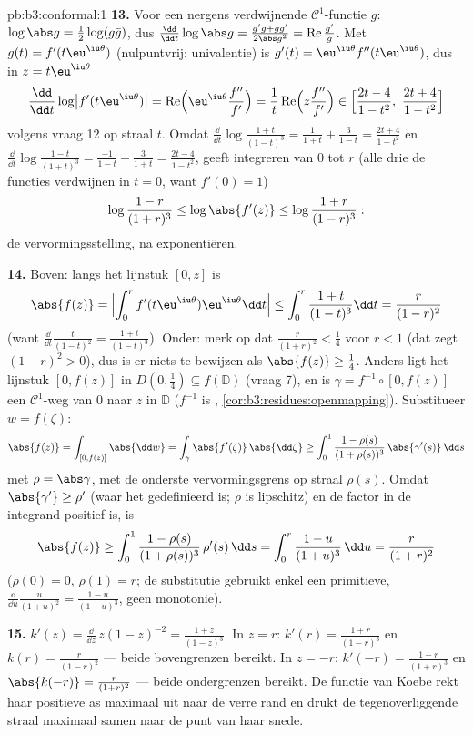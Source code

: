 \begin{solution}{pb:b3:conformal:1}
\textbf{13.} Voor een nergens verdwijnende $\mathcal C^1$-functie
$g$: $\log\abs g = \frac12\log(g\bar g)$, dus $\frac{\dd}{\dd
t}\log\abs g = \frac{g'\bar g + g\bar g'}{2\abs g^2} =
\operatorname{Re}\frac{g'}g$. Met $g(t) = f'(t\eu^{\iu\theta})$
(nulpuntvrij: univalentie) is $g'(t) =
\eu^{\iu\theta}f''(t\eu^{\iu\theta})$, dus in $z =
t\eu^{\iu\theta}$
\[
\frac{\dd}{\dd t}\log\bigl|f'(t\eu^{\iu\theta})\bigr|
= \operatorname{Re}\Bigl(\eu^{\iu\theta}
\frac{f''}{f'}\Bigr)
= \frac1t\operatorname{Re}\Bigl(z\frac{f''}{f'}\Bigr)
\in \Bigl[\frac{2t - 4}{1 - t^2},\
\frac{2t + 4}{1 - t^2}\Bigr]
\]
volgens vraag 12 op straal $t$. Omdat $\frac{\dd}{\dd
t}\log\frac{1+t}{(1-t)^3} = \frac1{1+t} + \frac3{1-t} =
\frac{2t+4}{1-t^2}$ en $\frac{\dd}{\dd
t}\log\frac{1-t}{(1+t)^3} = \frac{-1}{1-t} - \frac3{1+t} =
\frac{2t-4}{1-t^2}$, geeft integreren van $0$ tot $r$ (alle drie
de functies verdwijnen in $t = 0$, want $f'(0) = 1$)
\[
\log\frac{1-r}{(1+r)^3} \leq \log\abs{f'(z)} \leq
\log\frac{1+r}{(1-r)^3} :
\]
de vervormingsstelling, na exponentiëren.

\textbf{14.} Boven: langs het lijnstuk $[0, z]$ is
\[
\abs{f(z)} = \Bigl|\int_0^rf'(t\eu^{\iu\theta})
\eu^{\iu\theta}\dd t\Bigr|
\leq \int_0^r\frac{1+t}{(1-t)^3}\dd t
= \frac{r}{(1-r)^2}
\]
(want $\frac{\dd}{\dd t}\frac t{(1-t)^2} =
\frac{1+t}{(1-t)^3}$). Onder: merk op dat $\frac r{(1+r)^2} <
\frac14$ voor $r < 1$ (dat zegt $(1-r)^2 > 0$), dus is er niets
te bewijzen als $\abs{f(z)} \geq \frac14$. Anders ligt het
lijnstuk $[0, f(z)]$ in $D(0, \frac14) \subseteq f(\mathbb D)$
(vraag 7), en is $\gamma = f^{-1}\circ[0, f(z)]$ een $\mathcal
C^1$-weg van $0$ naar $z$ in $\mathbb D$ ($f^{-1}$ is ,
\cref{cor:b3:residues:openmapping}). Substitueer $w = f(\zeta)$:
\[
\abs{f(z)} = \int_{[0,f(z)]}\abs{\dd w}
= \int_\gamma\abs{f'(\zeta)}\,\abs{\dd\zeta}
\geq \int_0^1\frac{1 - \rho(s)}{(1 + \rho(s))^3}
\,\abs{\gamma'(s)}\,\dd s
\]
met $\rho = \abs\gamma$, met de onderste vervormingsgrens op
straal $\rho(s)$. Omdat $\abs{\gamma'} \geq \rho'$ (waar het
gedefinieerd is; $\rho$ is lipschitz) en de factor in de
integrand positief is, is
\[
\abs{f(z)} \geq \int_0^1
\frac{1 - \rho(s)}{(1 + \rho(s))^3}\,\rho'(s)\,\dd s
= \int_0^{r}\frac{1 - u}{(1 + u)^3}\,\dd u
= \frac{r}{(1 + r)^2}
\]
($\rho(0) = 0$, $\rho(1) = r$; de substitutie gebruikt enkel een
primitieve, $\frac{\dd}{\dd u}\frac u{(1+u)^2} =
\frac{1-u}{(1+u)^3}$, geen monotonie).

\textbf{15.} $k'(z) = \frac{\dd}{\dd z}\,z(1 - z)^{-2} = \frac{1
+ z}{(1 - z)^3}$. In $z = r$: $k'(r) = \frac{1+r}{(1-r)^3}$ en
$k(r) = \frac r{(1-r)^2}$ --- beide bovengrenzen bereikt. In $z =
-r$: $k'(-r) = \frac{1-r}{(1+r)^3}$ en $\abs{k(-r)} = \frac
r{(1+r)^2}$ --- beide ondergrenzen bereikt. De functie van Koebe
rekt haar positieve as maximaal uit naar de verre rand en drukt
de tegenoverliggende straal maximaal samen naar de punt van haar
snede.


\end{solution}
